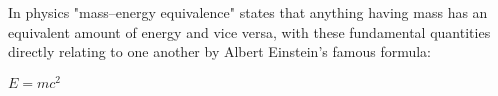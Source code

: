 In physics "mass–energy equivalence" states that anything having mass has an equivalent amount of energy and vice versa, with these fundamental quantities directly relating to one another by Albert Einstein's famous formula:

$E=mc^2$